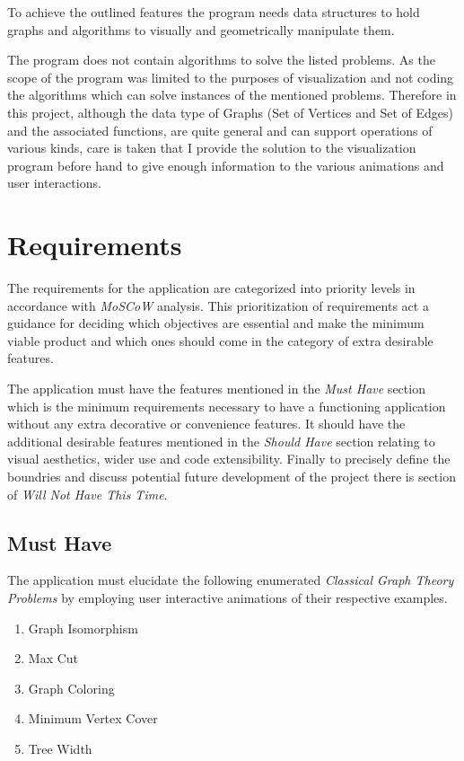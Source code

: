 To achieve the outlined features the program needs data structures to hold
graphs and algorithms to visually and geometrically manipulate them. 

The program does not contain algorithms to solve
the listed problems. As the scope of the program was limited to the purposes of
visualization and not coding the algorithms which can solve instances of the
mentioned problems.  Therefore in this project, although the data type of
Graphs (Set of Vertices and Set of Edges) and the associated functions, are
quite general and can support operations of various kinds, care is taken that I
provide the solution to the visualization program before hand to give enough
information to the various animations and user interactions.


\section{Requirements}
\label{requirements: requirements}

The requirements for the application are categorized into priority
levels in accordance with \emph{MoSCoW} analysis. This prioritization of
requirements act a guidance for deciding which objectives are essential and
make the minimum viable product and which ones should come in the category of
extra desirable features. \cite{Hudaib2018}

The application must have the features mentioned in the \emph{Must
Have} section which is the minimum requirements necessary to have a functioning
application without any extra decorative or convenience features. It should have the additional
desirable features mentioned in the \emph{Should Have} section relating to
visual aesthetics, wider use and code extensibility.  Finally to precisely
define the boundries and discuss potential future development of the project there is section of \emph{Will Not Have
This Time}.

\subsection{Must Have}
\label{requirements: musthave}
The application must elucidate the following enumerated \emph{Classical Graph Theory
Problems} by employing user interactive animations of their respective examples.
\begin{enumerate}
\item Graph Isomorphism
\item Max Cut
\item Graph Coloring
\item Minimum Vertex Cover
\item Tree Width
\end{enumerate}

